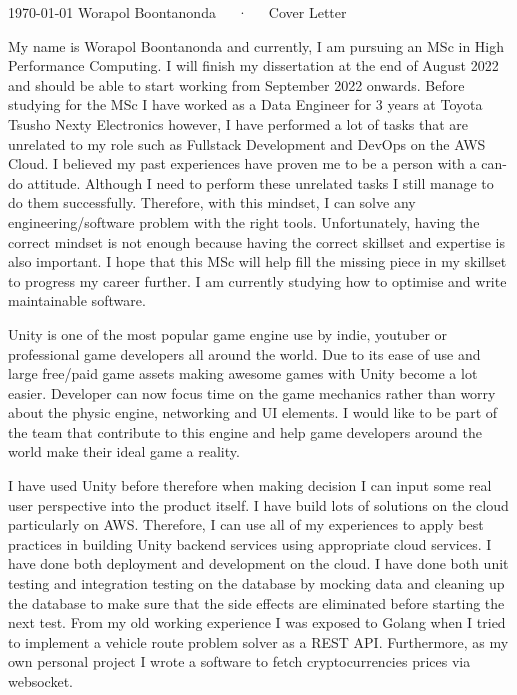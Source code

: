 \documentclass[11pt, a4paper]{awesome-cv}
\begin{document}
\makecvheader[R]

\makecvfooter
  {\today}
  {Worapol Boontanonda~~~·~~~Cover Letter}
  {}

\makelettertitle

\begin{cvletter}

My name is Worapol Boontanonda and currently, I am pursuing an MSc in High Performance Computing.
I will finish my dissertation at the end of August 2022 and should be able to start working from
September 2022 onwards.
Before studying for the MSc I have worked as a Data Engineer for 3 years at Toyota Tsusho Nexty Electronics 
however, I have performed a lot of tasks that are unrelated to my role such as Fullstack Development 
and DevOps on the AWS Cloud. I believed my past experiences have proven me to be a person 
with a can-do attitude. Although I need to perform these unrelated tasks I still manage to do them successfully. 
Therefore, with this mindset, I can solve any engineering/software problem with the right tools. 
Unfortunately, having the correct mindset is not enough 
because having the correct skillset and expertise is also important. 
I hope that this MSc will help fill the missing piece in my skillset to progress my career further. I am currently studying how to optimise and write maintainable software.

Unity is one of the most popular game engine use by indie, youtuber or professional game developers all around the world. Due to its ease of use and large free/paid game assets making awesome games with Unity become a lot easier. Developer can now focus time on the game mechanics rather than worry about the physic engine, networking and UI elements. I would like to be part of the team that contribute to this engine and help game developers around the world make their ideal game a reality.

I have used Unity before therefore when making decision I can input some real user perspective into the product itself. I have build lots of solutions on the cloud particularly on AWS. Therefore, I can use all of my experiences to apply best practices in building Unity backend services using appropriate cloud services. I have done both deployment and development on the cloud. I have done both unit testing and integration testing on the database by mocking data and cleaning up the database to make sure that the side effects are eliminated before starting the next test. From my old working experience I was exposed to Golang when I tried to implement a vehicle route problem solver as a REST API. Furthermore, as my own personal project I wrote a software to fetch cryptocurrencies prices via websocket.


\end{cvletter}
\end{document}
